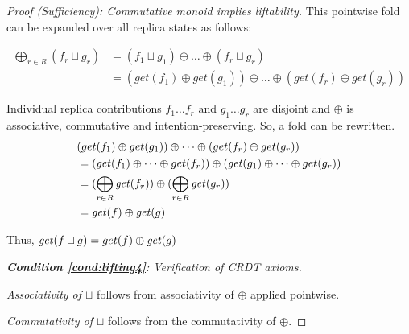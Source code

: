 \begin{proof}[Proof (Sufficiency): Commutative monoid implies liftability]
This pointwise fold can be expanded over all replica states as follows:

\begin{align*}
\bigoplus_{r \in R} (f_r \sqcup g_r) &= (f_1 \sqcup g_1) \oplus \dots \oplus (f_r \sqcup g_r) \\
&=   (get(f_1) \oplus get(g_1)) \oplus \dots \oplus (get(f_r) \oplus get(g_r))
\end{align*}

Individual replica contributions $f_1 \dots f_r \text{ and } g_1 \dots g_r$ are disjoint and $\oplus$ is associative, commutative and intention-preserving. So, a fold can be rewritten.
\begin{align*}
   & (get(f_1) \oplus get(g_1)) \oplus \dots \oplus (get(f_r) \oplus get(g_r)) \\
     &=   (\mathit{get}(f_1) \oplus \dots \oplus get(f_r)) \oplus (\mathit{get}(g_1) \oplus \dots \oplus get(g_r)) \\
    &= (\bigoplus_{r \in R} \mathit{get}(f_r)) \oplus (\bigoplus_{r \in R} \mathit{get}(g_r)) \\
    &= \mathit{get}(f) \oplus \mathit{get}(g)
\end{align*}

Thus, $\mathit{get}(f \sqcup g) = get(f) \oplus \mathit{get}(g)$










\medskip
\noindent\emph{\textbf{Condition \ref{cond:lifting4}}: Verification of CRDT axioms.}

\noindent\textit{Associativity of $\sqcup$} follows from associativity of $\oplus$ applied pointwise.

\noindent\textit{Commutativity of $\sqcup$} follows from the commutativity of $\oplus$.


\end{proof}
